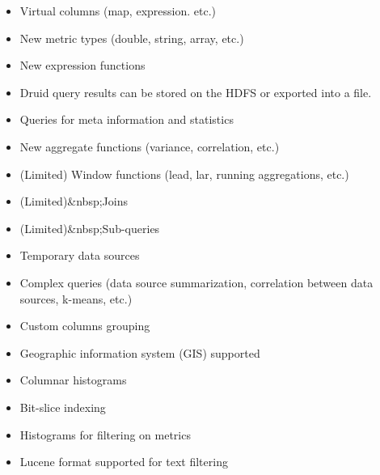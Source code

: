\documentclass[letterpaper,10pt,english]{sphinxmanual}
\begin{document}
\begin{itemize}
\item {} 
Virtual columns (map, expression. etc.)

\item {} 
New metric types (double, string, array, etc.)

\item {} 
New expression functions

\item {} 
Druid query results can be stored on the HDFS or exported into a file.

\item {} 
Queries for meta information and statistics

\item {} 
New aggregate functions (variance, correlation, etc.)

\item {} 
(Limited) Window functions (lead, lar, running aggregations, etc.)

\item {} 
(Limited)\&nbsp;Joins

\item {} 
(Limited)\&nbsp;Sub-queries

\item {} 
Temporary data sources

\item {} 
Complex queries (data source summarization, correlation between data sources, k-means, etc.)

\item {} 
Custom columns grouping

\item {} 
Geographic information system (GIS) supported

\item {} 
Columnar histograms

\item {} 
Bit-slice indexing

\end{itemize}

\begin{itemize}
\item {} 
Histograms for filtering on metrics

\item {} 
Lucene format supported for text filtering

\end{itemize}
\end{document}
